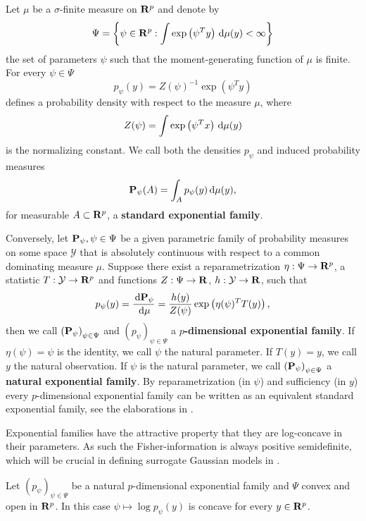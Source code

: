 \begin{definition}
    Let $\mu$ be a $\sigma$-finite measure on $\R^{p}$ and denote by 
    $$\Psi = \left\{\psi \in \R^{p} : \int \exp \left( \psi^{T} y \right) \d\mu(y) < \infty\right\}$$
    the set of parameters $\psi$ such that the moment-generating function of $\mu$ is finite. 
    For every $\psi \in \Psi$ $$p_{\psi}(y) = Z(\psi)^{-1} \exp (\psi^{T} y)$$ defines a probability density with respect to the measure $\mu$, where $$Z(\psi) = \int \exp \left( \psi^{T} x \right) \d\mu(y)$$ is the normalizing constant. 
    We call both the densities $p_{\psi}$ and induced probability measures $$ \P_{\psi} (A) = \int_{A} p_{\psi}(y) \d \mu(y),$$ for measurable $A \subset \R^{p}$, a \textbf{standard exponential family}.

    Conversely, let $\P_{\psi}, \psi \in \Psi$ be a given parametric family of probability measures on some space $\mathcal Y$ that is absolutely continuous with respect to a common dominating measure $\mu$. Suppose there exist a reparametrization $\eta : \Psi \to \R^{p}$, a statistic $T: \mathcal Y \to \R^{p}$ and functions $Z: \Psi\to \R$, $h:\mathcal Y \to \R$, such that
    $$
        p_{\psi}(y) = \frac{\d \P_{\psi}}{\d \mu} = \frac{h(y)}{Z(\psi) } \exp \left(\eta(\psi)^{T}T(y)\right),
    $$
    then we call $\left(\P_{\psi}\right)_{\psi \in \Psi} $ and $\left(p_{\psi}\right)_{ \psi \in \Psi}$ a \textbf{$p$-dimensional exponential family}. If $\eta(\psi) = \psi$ is the identity, we call $\psi$ the natural parameter. If $T(y) = y$, we call $y$ the natural observation. If $\psi$ is the natural parameter, we call $\left( \P_{\psi} \right)_{\psi \in \Psi}$ a \textbf{natural exponential family}. By reparametrization (in $\psi$) and sufficiency (in $y$) every $p$-dimensional exponential family can be written as an equivalent standard exponential family, see the elaborations in \citep[Chapter 1]{Brown1986Fundamentals}.
\end{definition}

Exponential families have the attractive property that they are log-concave in their parameters. As such the Fisher-information is always positive semidefinite, which will be crucial in defining surrogate Gaussian models in .
\begin{lemma}
    \label{lem:log-concavity}
    Let $\left(p_{\psi}\right)_{\psi \in \Psi}$ be a natural $p$-dimensional exponential family and $\Psi$ convex and open in $\R^{p}$. In this case $\psi \mapsto \log p_{\psi}(y)$ is concave for every $y \in \R^{p}$.
\end{lemma}

